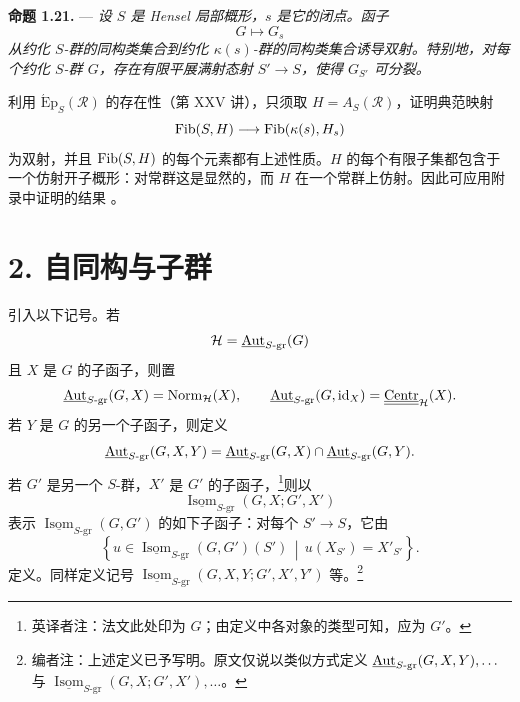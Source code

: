 \medskip\noindent\textbf{命题 1.21.} ---
{\itshape 设 \(S\) 是 Hensel 局部概形，\(s\) 是它的闭点。函子
\[
  G\longmapsto G_s
\]
从约化 \(S\)-群的同构类集合到约化 \(\kappa(s)\)-群的同构类集合诱导双射。特别地，对每个约化 \(S\)-群 \(G\)，存在有限平展满射态射 \(S'\to S\)，使得 \(G_{S'}\) 可分裂。}

利用 \(\operatorname{\acute{E}p}_S(\mathscr R)\) 的存在性（第 XXV 讲），只须取 \(H=A_S(\mathscr R)\)，证明典范映射
\[
  \operatorname{Fib}(S,H)\longrightarrow\operatorname{Fib}(\kappa(s),H_s)
\]
为双射，并且 \(\operatorname{Fib}(S,H)\) 的每个元素都有上述性质。\(H\) 的每个有限子集都包含于一个仿射开子概形：对常群这是显然的，而 \(H\) 在一个常群上仿射。因此可应用附录中证明的结果 。

\section*{2. 自同构与子群}

引入以下记号。若
\[
  \mathcal H=\underline{\operatorname{Aut}}_{S\text{-}\mathrm{gr}}(G)
\]
且 \(X\) 是 \(G\) 的子函子，则置
\[
  \underline{\operatorname{Aut}}_{S\text{-}\mathrm{gr}}(G,X)
  =\operatorname{Norm}_{\mathcal H}(X),
  \qquad
  \underline{\operatorname{Aut}}_{S\text{-}\mathrm{gr}}(G,\operatorname{id}_X)
  =\underline{\underline{\operatorname{Centr}}}_{\mathcal H}(X).
\]
若 \(Y\) 是 \(G\) 的另一个子函子，则定义
\[
  \underline{\operatorname{Aut}}_{S\text{-}\mathrm{gr}}(G,X,Y)
  =
  \underline{\operatorname{Aut}}_{S\text{-}\mathrm{gr}}(G,X)
  \cap
  \underline{\operatorname{Aut}}_{S\text{-}\mathrm{gr}}(G,Y).
\]
若 \(G'\) 是另一个 \(S\)-群，\(X'\) 是 \(G'\) 的子函子，\footnote{英译者注：法文此处印为 \(G\)；由定义中各对象的类型可知，应为 \(G'\)。}则以
\[
  \underline{\operatorname{Isom}}_{S\text{-}\mathrm{gr}}
    (G,X;G',X')
\]
表示 \(\underline{\operatorname{Isom}}_{S\text{-}\mathrm{gr}}(G,G')\) 的如下子函子：对每个 \(S'\to S\)，它由
\[
  \left\{
    u\in
    \underline{\operatorname{Isom}}_{S\text{-}\mathrm{gr}}(G,G')(S')
    \,\middle|\,
    u(X_{S'})=X'_{S'}
  \right\}.
\]
定义。同样定义记号 \(\underline{\operatorname{Isom}}_{S\text{-}\mathrm{gr}}(G,X,Y;G',X',Y')\) 等。\footnote{编者注：上述定义已予写明。原文仅说以类似方式定义 \(\underline{\operatorname{Aut}}_{S\text{-}\mathrm{gr}}(G,X,Y),\ldots\) 与 \(\underline{\operatorname{Isom}}_{S\text{-}\mathrm{gr}}(G,X;G',X'),\ldots\)。}

